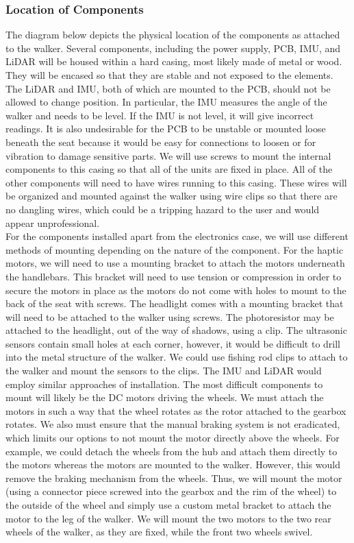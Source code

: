 \subsubsection{Location of Components}
\noindent The diagram below depicts the physical location of the components as attached to the walker. Several components, including the power supply, PCB, IMU, and LiDAR will be housed within a hard casing, most likely made of metal or wood. They will be encased so that they are stable and not exposed to the elements. The LiDAR and IMU, both of which are mounted to the PCB, should not be allowed to change position. In particular, the IMU measures the angle of the walker and needs to be level. If the IMU is not level, it will give incorrect readings. It is also undesirable for the PCB to be unstable or mounted loose beneath the seat because it would be easy for connections to loosen or for vibration to damage sensitive parts. We will use screws to mount the internal components to this casing so that all of the units are fixed in place. All of the other components will need to have wires running to this casing. These wires will be organized and mounted against the walker using wire clips so that there are no dangling wires, which could be a tripping hazard to the user and would appear unprofessional.\\

\noindent For the components installed apart from the electronics case, we will use different methods of mounting depending on the nature of the component. For the haptic motors, we will need to use a mounting bracket to attach the motors underneath the handlebars. This bracket will need to use tension or compression in order to secure the motors in place as the motors do not come with holes to mount to the back of the seat with screws. The headlight comes with a mounting bracket that will need to be attached to the walker using screws. The photoresistor may be attached to the headlight, out of the way of shadows, using a clip. The ultrasonic sensors contain small holes at each corner, however, it would be difficult to drill into the metal structure of the walker. We could use fishing rod clips to attach to the walker and mount the sensors to the clips. The IMU and LiDAR would employ similar approaches of installation. The most difficult components to mount will likely be the DC motors driving the wheels. We must attach the motors in such a way that the wheel rotates as the rotor attached to the gearbox rotates. We also must ensure that the manual braking system is not eradicated, which limits our options to not mount the motor directly above the wheels. For example, we could detach the wheels from the hub and attach them directly to the motors whereas the motors are mounted to the walker. However, this would remove the braking mechanism from the wheels. Thus, we will mount the motor (using a connector piece screwed into the gearbox and the rim of the wheel) to the outside of the wheel and simply use a custom metal bracket to attach the motor to the leg of the walker. We will mount the two motors to the two rear wheels of the walker, as they are fixed, while the front two wheels swivel.\\ 

